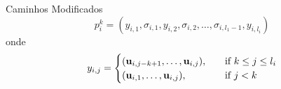 \begin{frame}{Caminhos Modificados}
\begin{equation}
  \label{eq:modifiedPath}
 p_i^k= (y_{i,1},\sigma_{i,1},y_{i,2},\sigma_{i,2},\dots,\sigma_{i,l_1-1},y_{i,l_i}) 
\end{equation}
onde 
\begin{equation}
  \label{eq:modifiedPathb}
y_{i,j}=\begin{cases}
    (\mathbf{u}_{i,j-k+1},\dots,\mathbf{u}_{i,j}),& \quad \text{if } k\leq j\leq l_i\\
    (\mathbf{u}_{i,1},\dots,\mathbf{u}_{i,j}),  & \quad \text{if } j<k
  \end{cases}
\end{equation}
\end{frame}


